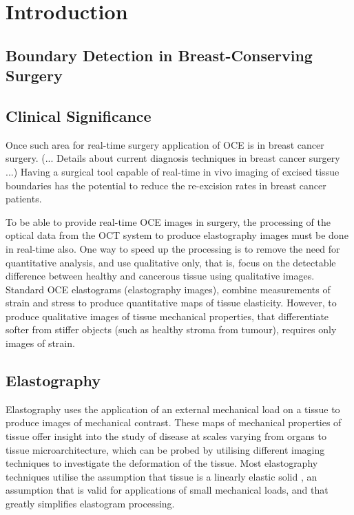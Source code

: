 \chapter{Introduction}

\section{Boundary Detection in Breast-Conserving Surgery}

\section{Clinical Significance}

Once such area for real-time surgery application of OCE is in breast cancer surgery. (... Details about current diagnosis techniques in breast cancer surgery ...) Having a surgical tool capable of real-time in vivo imaging of excised tissue boundaries has the potential to reduce the re-excision rates in breast cancer patients.

To be able to provide real-time OCE images in surgery, the processing of the optical data from the OCT system to produce elastography images must be done in real-time also. One way to speed up the processing is to remove the need for quantitative analysis, and use qualitative only, that is, focus on the detectable difference between healthy and cancerous tissue using qualitative images. Standard OCE elastograms (elastography images), combine measurements of strain and stress to produce quantitative maps of tissue elasticity. However, to produce qualitative images of tissue mechanical properties, that differentiate softer from stiffer objects (such as healthy stroma from tumour), requires only images of strain. 

\section{Elastography}
Elastography uses the application of an external mechanical load on a tissue to produce images of mechanical contrast. These maps of mechanical properties of tissue offer insight into the study of disease at scales varying from organs to tissue microarchitecture, which can be probed by utilising different imaging techniques to investigate the deformation of the tissue. Most elastography techniques utilise the assumption that tissue is a linearly elastic solid \cite{kennedy_review_2014}, an assumption that is valid for applications of small mechanical loads, and that greatly simplifies elastogram processing. 


